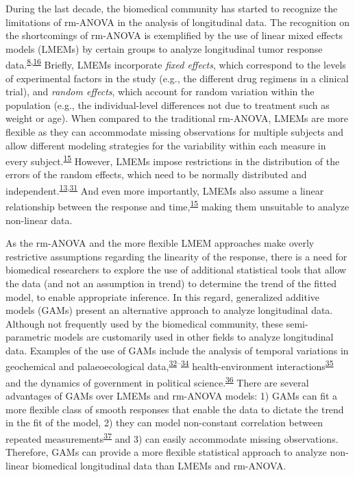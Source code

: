 \documentclass[
]{article}
\begin{document}
During the last decade, the biomedical community has started to recognize the limitations of rm-ANOVA in the analysis of longitudinal data. The recognition on the shortcomings of rm-ANOVA is exemplified by the use of linear mixed effects models (LMEMs) by certain groups to analyze longitudinal tumor response data.\textsuperscript{\protect\hyperlink{ref-skala2010}{8},\protect\hyperlink{ref-vishwanath2009}{16}} Briefly, LMEMs incorporate \emph{fixed effects}, which correspond to the levels of experimental factors in the study (e.g., the different drug regimens in a clinical trial), and \emph{random effects}, which account for random variation within the population (e.g., the individual-level differences not due to treatment such as weight or age). When compared to the traditional rm-ANOVA, LMEMs are more flexible as they can accommodate missing observations for multiple subjects and allow different modeling strategies for the variability within each measure in every subject.\textsuperscript{\protect\hyperlink{ref-pinheiro2006}{15}} However, LMEMs impose restrictions in the distribution of the errors of the random effects, which need to be normally distributed and independent.\textsuperscript{\protect\hyperlink{ref-gueorguieva2004}{13},\protect\hyperlink{ref-barr2013}{31}} And even more importantly, LMEMs also assume a linear relationship between the response and time,\textsuperscript{\protect\hyperlink{ref-pinheiro2006}{15}} making them unsuitable to analyze non-linear data.

As the rm-ANOVA and the more flexible LMEM approaches make overly restrictive assumptions regarding the linearity of the response, there is a need for biomedical researchers to explore the use of additional statistical tools that allow the data (and not an assumption in trend) to determine the trend of the fitted model, to enable appropriate inference. In this regard, generalized additive models (GAMs) present an alternative approach to analyze longitudinal data. Although not frequently used by the biomedical community, these semi-parametric models are customarily used in other fields to analyze longitudinal data. Examples of the use of GAMs include the analysis of temporal variations in geochemical and palaeoecological data,\textsuperscript{\protect\hyperlink{ref-rose2012}{32}--\protect\hyperlink{ref-simpson2018}{34}} health-environment interactions\textsuperscript{\protect\hyperlink{ref-yang2012}{35}} and the dynamics of government in political science.\textsuperscript{\protect\hyperlink{ref-beck1998}{36}} There are several advantages of GAMs over LMEMs and rm-ANOVA models: 1) GAMs can fit a more flexible class of smooth responses that enable the data to dictate the trend in the fit of the model, 2) they can model non-constant correlation between repeated measurements\textsuperscript{\protect\hyperlink{ref-wood2017}{37}} and 3) can easily accommodate missing observations. Therefore, GAMs can provide a more flexible statistical approach to analyze non-linear biomedical longitudinal data than LMEMs and rm-ANOVA.
\end{document}
